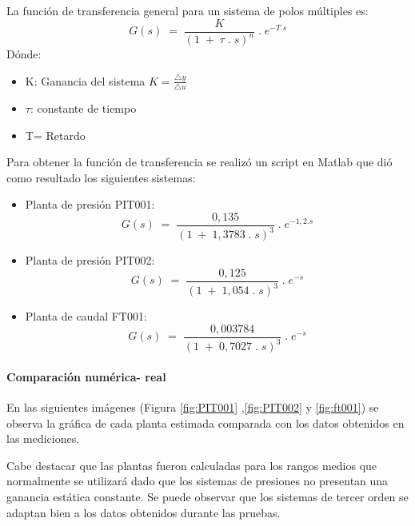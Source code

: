 La función de transferencia general para un sistema de polos múltiples es:
\begin{equation}
	G(s)\;=\;\frac K{(1\;+\;\tau\;.\;s)^n}\;.\;e^{-T.s}
\end{equation}
Dónde:
\begin{itemize}
	\item K:  Ganancia del sistema $K = \frac{\triangle y}{\triangle u}$
	\item $\tau$: constante de tiempo
	\item T= Retardo
\end{itemize}
Para obtener la función de transferencia se realizó un script en Matlab que dió como resultado los siguientes sistemas:
\begin{itemize}
	\item Planta de presión PIT001:
	\begin{equation}
	 G(s)\;=\;\frac {0,135}{(1\;+\;1,3783\;.\;s)^3}\;.\;e^{-1,2.s}
	\end{equation}
	\item Planta de presión PIT002: 	
	\begin{equation}
		G(s)\;=\;\frac {0,125}{(1\;+\;1,054\;.\;s)^3}\;.\;e^{-s}
	\end{equation}
	\item Planta de caudal FT001:
		\begin{equation}
		G(s)\;=\;\frac {0,003784}{(1\;+\;0,7027\;.\;s)^3}\;.\;e^{-s}
	\end{equation}
\end{itemize}

\paragraph{Comparación numérica- real}
En las siguientes imágenes (Figura \ref{fig:PIT001} ,\ref{fig:PIT002} y \ref{fig:ft001}) se observa la gráfica de cada planta estimada comparada con los datos obtenidos en las mediciones.
\begin{comment}
$C:\Users\glori\Desktop\DANIELA\VISUAL_DANI\Automa\MATLAB\Prueba_PLANTA\Imaagenes Calculo Plantas\FIT001
Strenj_RESPUESTA.png$
\end{comment}

Cabe destacar que las plantas fueron calculadas para los rangos medios que normalmente se utilizará dado que los sistemas de presiones no presentan una ganancia estática constante.
Se puede observar que los sistemas de tercer orden se adaptan bien a los datos obtenidos durante las pruebas.
\begin{comment}
no borrar opr las dudas que quisimos poner esto
 
 dónde el motor no era esforzado a calentarse ni la bomba era sobreexigida

escalones ubicados en la parte central del rango útil estipulado .

 además obtener un control apropiado al sistema: algo no muy rapido ni muy lento
\end{comment}


